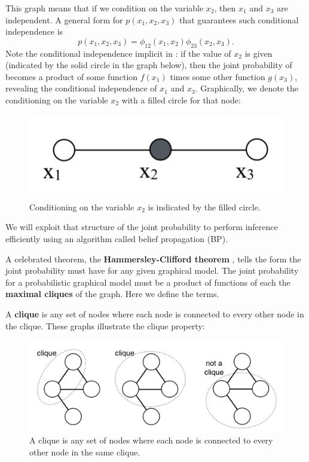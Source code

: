 This graph means that if we condition on the variable $x_2$,
then $x_1$ and $x_3$ are independent.  A general form for
$p(x_1, x_2, x_3)$ that guarantees such conditional independence is
\begin{equation}
p(x_1, x_2, x_3) =  \phi_{12}(x_1, x_2)  \phi_{23}(x_2, x_3).
\label{eq:x1x2x3}
\end{equation}
Note the conditional independence implicit in \eqn{\ref{eq:x1x2x3}}:  if the value of $x_2$ is given
(indicated by the solid circle in the graph below), then
the joint probability of \eqn{\ref{eq:x1x2x3}} becomes a product of
some function $f(x_1)$ times some other function $g(x_3)$, revealing
the conditional independence of $x_1$ and $x_3$.  Graphically, we denote the conditioning on the variable $x_2$ with a filled circle for that node:
\begin{figure}
\centerline{\includegraphics[width=0.26\linewidth]{figures/graphical_models/3node.pdf}} 
\caption{Conditioning on the variable $x_2$ is indicated by the filled circle.}
\label{graph:3node2}
\end{figure}

We will exploit that structure of the joint
probability to perform inference efficiently using an algorithm called belief propagation (BP).

A celebrated theorem, the {\bf Hammersley-Clifford theorem} \cite{Hammersley1971}, tells 
the form the joint probability must have for any given graphical model.
The joint probability for a probabilistic graphical model must be
a product of functions of each the {\bf maximal cliques} 
of the
graph.  Here we define the terms.

A {\bf clique}
is any set of nodes where each node is connected to
every other node in the clique.  These graphs illustrate the 
clique property:
\begin{figure}
\centerline{\includegraphics[width=0.5\linewidth]{figures/graphical_models/cliques1.pdf}}
\caption{A clique is any set of nodes where each node is connected to
every other node in the same clique.}
\end{figure}

